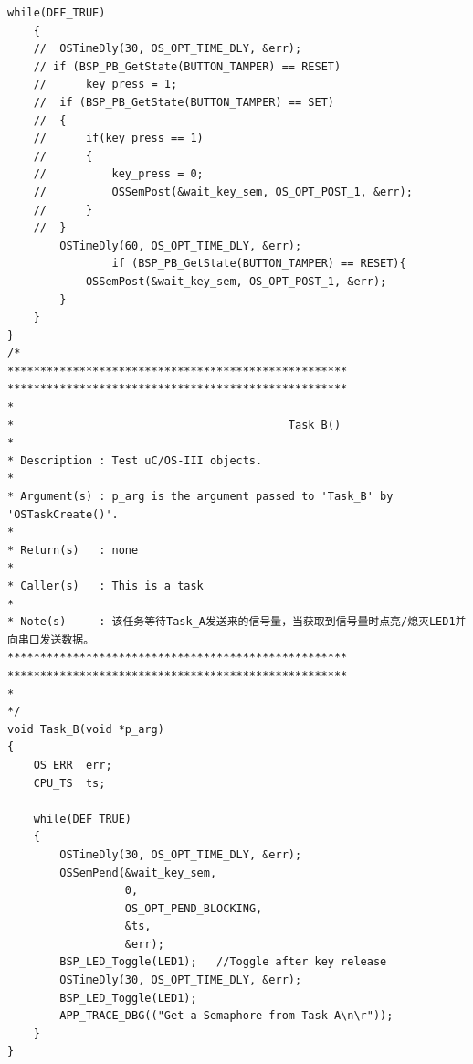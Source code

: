 ﻿\documentclass[UTF8,12pt]{article}
\begin{document}
\begin{lstlisting}[frame=shadowbox]
	while(DEF_TRUE)
	{
	// 	OSTimeDly(30, OS_OPT_TIME_DLY, &err);
    // if (BSP_PB_GetState(BUTTON_TAMPER) == RESET)
	// 		key_press = 1;
	// 	if (BSP_PB_GetState(BUTTON_TAMPER) == SET)
	// 	{
	// 		if(key_press == 1)
	// 		{
	// 			key_press = 0;
	// 			OSSemPost(&wait_key_sem, OS_OPT_POST_1, &err);
	// 		}
	// 	}	
        OSTimeDly(60, OS_OPT_TIME_DLY, &err);
				if (BSP_PB_GetState(BUTTON_TAMPER) == RESET){
            OSSemPost(&wait_key_sem, OS_OPT_POST_1, &err);
        }
	}
}
/*
****************************************************
****************************************************
*
*                                          Task_B()
*
* Description : Test uC/OS-III objects.
*
* Argument(s) : p_arg is the argument passed to 'Task_B' by 'OSTaskCreate()'.
*
* Return(s)   : none
*
* Caller(s)   : This is a task
*
* Note(s)     : 该任务等待Task_A发送来的信号量，当获取到信号量时点亮/熄灭LED1并向串口发送数据。
****************************************************
****************************************************
*
*/
void Task_B(void *p_arg)
{			  
	OS_ERR  err;
	CPU_TS  ts;

	while(DEF_TRUE)
	{
		OSTimeDly(30, OS_OPT_TIME_DLY, &err);
		OSSemPend(&wait_key_sem,
                  0,
                  OS_OPT_PEND_BLOCKING,
                  &ts,
                  &err);
		BSP_LED_Toggle(LED1);	//Toggle after key release
        OSTimeDly(30, OS_OPT_TIME_DLY, &err);
        BSP_LED_Toggle(LED1);
		APP_TRACE_DBG(("Get a Semaphore from Task A\n\r"));
	}
}


\end{lstlisting}
\end{document}
